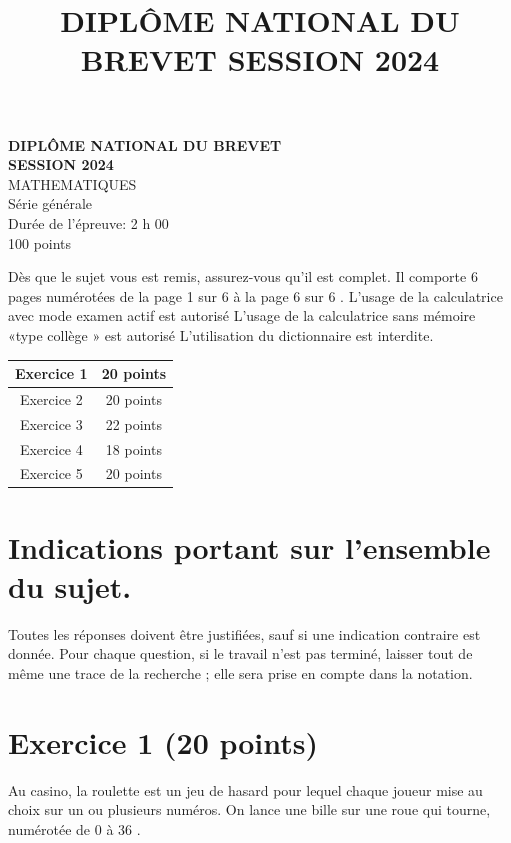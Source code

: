 \documentclass[a4paper,14pt]{extarticle}
\title{DIPLÔME NATIONAL DU BREVET SESSION 2024 }
\author{}
\date{}
\begin{document}
\vspace{.4\textheight}
\parbox[b]{0.75\textwidth}{
 {\Large\bfseries DIPLÔME NATIONAL DU BREVET }\\[0.5\baselineskip]
 {\Large\bfseries SESSION 2024 }\\[4\baselineskip]
 \large MATHEMATIQUES \\[0.5\baselineskip]
 \large Série générale \\[2\baselineskip]
 \normalsize Durée de l'épreuve: 2 h 00 \\[0.5\baselineskip]
 \normalsize 100 points \\[2\baselineskip]
 }

Dès que le sujet vous est remis, assurez-vous qu'il est complet.
Il comporte 6 pages numérotées de la page 1 sur 6 à la page 6 sur 6 .
L'usage de la calculatrice avec mode examen actif est autorisé 
L'usage de la calculatrice sans mémoire «type collège » est autorisé
L'utilisation du dictionnaire est interdite.

\begin{center}
\begin{tabular}{|c|c|}
\hline
Exercice 1 & 20 points \\
\hline
Exercice 2 & 20 points \\
\hline
Exercice 3 & 22 points \\
\hline
Exercice 4 & 18 points \\
\hline
Exercice 5 & 20 points \\
\hline
\end{tabular}
\end{center}

\newpage

\section*{Indications portant sur l'ensemble du sujet.}
Toutes les réponses doivent être justifiées, sauf si une indication contraire est donnée. Pour chaque question, si le travail n'est pas terminé, laisser tout de même une trace de la recherche ; elle sera prise en compte dans la notation.

\section*{Exercice 1 (20 points)}
Au casino, la roulette est un jeu de hasard pour lequel chaque joueur mise au choix sur un ou plusieurs numéros. On lance une bille sur une roue qui tourne, numérotée de 0 à 36 .
\end{document}
